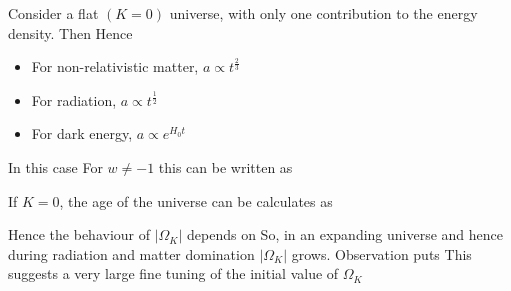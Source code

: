 \documentclass{article}
\begin{document}
\begin{example}
Consider a flat $(K=0)$ universe, with only one contribution to the energy density. Then 
Hence \begin{itemize}
    \item For non-relativistic matter, $a \propto t^{\frac{2}{3}}$
    \item For radiation, $a \propto t^\frac{1}{2}$
    \item For dark energy, $a \propto e^{H_0 t}$
\end{itemize}

In this case 
For $w\neq -1$ this can be written as 
\end{example}

\begin{prop}
If $K=0$, the age of the universe can be calculates as 
\end{prop}

\begin{example}\label{example:CSM:curvature problem}
Hence the behaviour of $|\Omega_K|$ depends on 
So, in an expanding universe 
and hence during radiation and matter domination $|\Omega_K|$ grows. Observation puts 
This suggests a very large fine tuning of the initial value of $\Omega_K$
\end{example}
\end{document}

